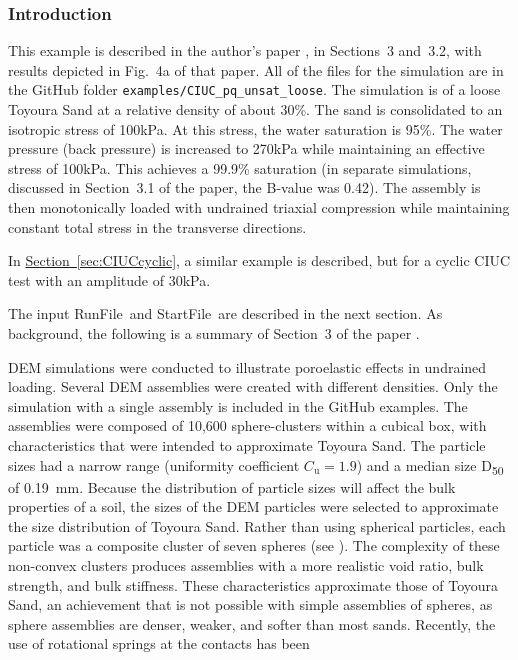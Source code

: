 \documentclass[letterpaper,11pt]{article}
\newcommand{\RunFile}{\textsf{RunFile}}
\newcommand{\StartFile}{\textsf{StartFile}}
\begin{document}
\subsubsection{Introduction}\label{sec:CIUCmono1}
This example is described in the author's paper \cite{Kuhn:2020a},
in Sections~3 and~3.2, with results depicted
in Fig.~4a of that paper.
All of the files for the simulation
are in the GitHub folder
\texttt{examples/CIUC\_pq\_unsat\_loose}.
The simulation is of a loose Toyoura Sand 
at a relative density of about 30\%.
The sand is consolidated to an isotropic stress
of 100kPa.
At this stress, the water saturation is 95\%.
The water pressure (back pressure) is increased
to 270kPa while maintaining an effective stress
of 100kPa.
This achieves a 99.9\% saturation
(in separate simulations, discussed in Section~3.1
of the paper, the B-value was 0.42).
The assembly is then monotonically loaded with undrained triaxial
compression while maintaining constant total stress
in the transverse directions.
\par
In \hyperref[sec:CIUCcyclic]{Section~\ref*{sec:CIUCcyclic}},
a similar example is described,
but for a cyclic CIUC test with an amplitude
of 30kPa.
\par
The input \RunFile\ and \StartFile\ are described
in the next section.
As background, the following is a summary of
Section~3 of the paper \cite{Kuhn:2020a}.
%
\par
DEM simulations were conducted to illustrate poroelastic
effects in undrained loading.
Several DEM assemblies were
created with different densities.
Only the simulation with a single assembly is included
in the GitHub examples.
The assemblies were
composed of 10,600 sphere-clusters
within a cubical box, with
characteristics that
were intended to approximate Toyoura Sand.
The particle sizes had a narrow range
(uniformity coefficient $C_{\text{u}}=1.9$)
and a median size D\textsubscript{50} of 0.19~mm.
Because the distribution of particle sizes will affect the bulk properties
of a soil, the sizes of the DEM particles were selected to
approximate the size distribution of Toyoura Sand.
Rather than using spherical particles, each particle was
a composite cluster of seven spheres (see \cite{Kuhn:2014c}).
The complexity of these non-convex clusters
produces assemblies with a more realistic void ratio,
bulk strength, and bulk stiffness.
These characteristics approximate those of
Toyoura Sand, an achievement that is not possible with simple assemblies
of spheres, as sphere assemblies are denser, weaker, and softer than
most sands.
Recently, the use of rotational springs at the contacts has been
\end{document}
